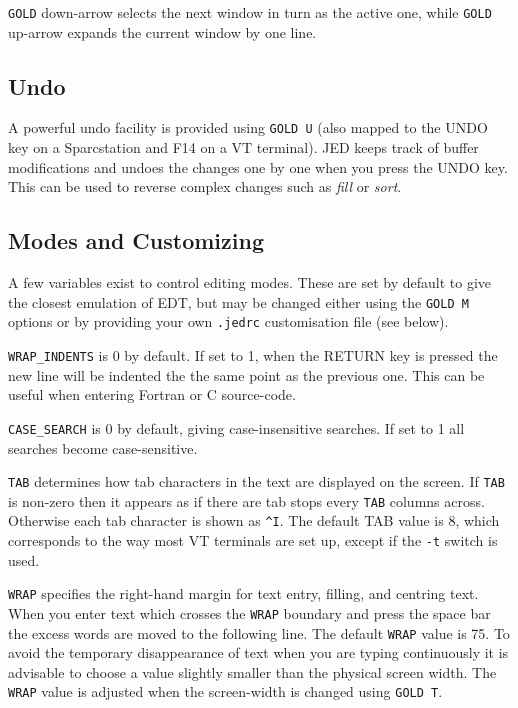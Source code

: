 {\tt GOLD} down-arrow selects the next window in turn as the active one,
while {\tt GOLD} up-arrow expands the current window by one line.

\subsection{Undo}

A powerful undo facility is provided using {\tt GOLD U} (also mapped to
the UNDO key on a Sparcstation and F14 on a VT terminal).  JED keeps
track of buffer modifications and undoes the changes one by one when you
press the UNDO key.  This can be used to reverse complex changes such as
{\em fill} or {\em sort}.

\subsection{Modes and Customizing}

A few variables exist to control editing modes. These are set by default
to give the closest emulation of EDT, but may be changed either using the
{\tt GOLD M} options or by providing your own {\tt .jedrc} customisation
file (see below).

{\tt WRAP\_INDENTS} is 0 by default.  If set to 1, when the RETURN
key is pressed the new line will be indented the the same point as the
previous one.  This can be useful when entering Fortran or C source-code.

{\tt CASE\_SEARCH} is 0 by default, giving case-insensitive searches.  
If set to 1 all searches become case-sensitive.

{\tt TAB} determines how tab characters in the text are displayed on
the screen. If {\tt TAB} is non-zero then it appears as if there are tab
stops every {\tt TAB} columns across.  Otherwise each tab character is
shown as {\verb+^I+}.  The default TAB value is 8, which corresponds to the
way most VT terminals are set up, except if the {\tt -t} switch is used.

{\tt WRAP} specifies the right-hand margin for text entry, filling, and
centring text. When you enter text which crosses the {\tt WRAP} boundary
and press the space bar the excess words are moved to the following line.
The default {\tt WRAP} value is 75.  To avoid the temporary disappearance
of text when you are typing continuously it is advisable to choose a
value slightly smaller than the physical screen width. The {\tt WRAP}
value is adjusted when the screen-width is changed using {\tt GOLD T}.

